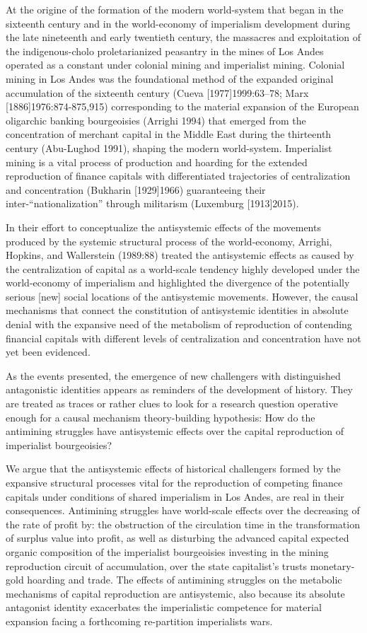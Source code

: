\documentclass[]{interact}
\theoremstyle{plain}%
\theoremstyle{definition}
\theoremstyle{remark}
\begin{document}
At the origine of the formation of the modern world-system that began in the sixteenth century and in the world-economy of imperialism development during the late nineteenth and early twentieth century, the massacres and exploitation of the indigenous-cholo proletarianized peasantry in the mines of Los Andes operated as a constant under colonial mining and imperialist mining.
Colonial mining in Los Andes was the foundational method of the expanded original accumulation of the sixteenth century (Cueva [1977]1999:63–78; Marx [1886]1976:874-875,915) corresponding to the material expansion of the European oligarchic banking bourgeoisies (Arrighi 1994) that emerged from the concentration of merchant capital in the Middle East during the thirteenth century (Abu-Lughod 1991), shaping the modern world-system. Imperialist mining is a vital process of production and hoarding for the extended reproduction of finance capitals with differentiated trajectories of centralization and concentration (Bukharin [1929]1966) guaranteeing their inter-“nationalization” through militarism (Luxemburg [1913]2015).

In their effort to conceptualize the antisystemic effects of the movements produced by the systemic structural process of the world-economy, Arrighi, Hopkins, and Wallerstein (1989:88) treated the antisystemic effects as caused by the centralization of capital as a world-scale tendency highly developed under the world-economy of imperialism and highlighted the divergence of the potentially serious [new] social locations of the antisystemic movements. However, the causal mechanisms that connect the constitution of antisystemic identities in absolute denial with the expansive need of the metabolism of reproduction of contending financial capitals with different levels of centralization and concentration have not yet been evidenced. 

As the events presented, the emergence of new challengers with distinguished antagonistic identities appears as reminders of the development of history. They are treated as traces or rather clues to look for a research question operative enough for a causal mechanism theory-building hypothesis: How do the antimining struggles have antisystemic effects over the capital reproduction of imperialist bourgeoisies?

We argue that the antisystemic effects of historical challengers formed by the expansive structural processes vital for the reproduction of competing finance capitals under conditions of shared imperialism in Los Andes, are real in their consequences. Antimining struggles have world-scale effects over the decreasing of the rate of profit by: the obstruction of the circulation time in the transformation of surplus value into profit, as well as disturbing the advanced capital expected organic composition of the imperialist bourgeoisies investing in the mining reproduction circuit of accumulation, over the state capitalist’s trusts monetary-gold hoarding and trade. The effects of antimining struggles on the metabolic mechanisms of capital reproduction are antisystemic, also because its absolute antagonist identity exacerbates the imperialistic competence for material expansion facing a forthcoming re-partition imperialists wars.
\end{document}
